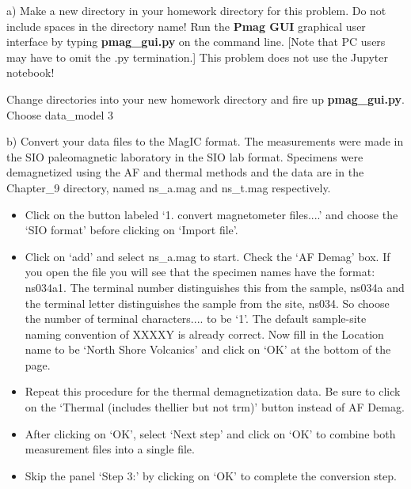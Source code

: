 {a) Make a  new directory in your homework directory for this problem.   Do not include spaces in the directory name!
Run the {\bf Pmag GUI} graphical user interface by typing {\bf pmag\_gui.py} on the command line.  [Note that PC users may have to omit the .py termination.]  This problem does not use the Jupyter notebook!

Change directories into your new homework directory and fire up {\bf pmag\_gui.py}. Choose data\_model 3  

b) Convert your data files to the MagIC format.   The measurements were made in the SIO paleomagnetic laboratory in the SIO lab format.  Specimens were demagnetized using the AF and thermal methods and the data are in the Chapter\_9 directory, named ns\_a.mag and ns\_t.mag respectively.  

\begin{itemize}
\item  Click on the button labeled `1. convert magnetometer files....'  and choose the `SIO format' before clicking on `Import file'.   
\item Click on `add'  and select ns\_a.mag to start.  Check the `AF Demag' box.  If you open the file you will see that the specimen names have the format:  ns034a1.   The terminal number distinguishes this from the sample, ns034a and the terminal letter distinguishes the sample from the site, ns034.  So choose the number of terminal characters....  to be `1'.  The default sample-site naming convention of XXXXY is already correct.  Now fill in the Location name to be `North Shore Volcanics' and click on `OK' at the bottom of the page.  
\item  Repeat this procedure for the thermal demagnetization data.  Be sure to click on the `Thermal (includes thellier but not trm)' button instead of AF Demag.  
\item After clicking on `OK', select `Next step'  and click on 	`OK'  to combine both measurement files into a single file.  
\item Skip the panel `Step 3:' by clicking on `OK'  to complete the conversion step.   
\end{itemize}

}
